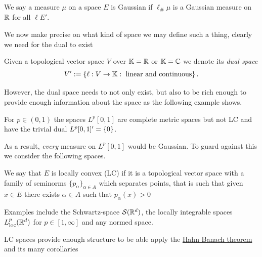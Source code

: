 \documentclass[
    a4paper,
    DIV=14,
    abstract=true,
    numbers=noenddot
]{scrartcl}
\begin{document}
\begin{definition}[Heuristic]
    We say a measure $\mu$ on a space $E$ is Gaussian if $\ell_{\#} \mu$ is a Gaussian measure on $\mathbb{R}$ for all $\ell E'$.
\end{definition}
We now make precise on what kind of space we may define such a thing, clearly we need for the dual to exist
\begin{definition}
Given a topological vector space $V$ over {$\mathbb{K}=\mathbb{R}$ or $\mathbb{K}=\mathbb{C}$}   we denote its \emph{dual space}
\begin{align*}
    V':=\left\{\ell :V\to {\mathbb{K}}: \text{ linear and continuous}\right\}.
\end{align*}
  \end{definition}
However, the dual space needs to not only exist, but also to be rich enough to provide enough information about the space as the following example shows.
\begin{example}
     For $p \in (0,1)$ the spaces $L^p[0,1]$ are complete metric spaces but not LC and have the trivial dual $L^p[0,1]'= \left\{0\right\} $.\exampleSymbol
\end{example}
As a result, \emph{every} measure on $L^p[0,1]$ would be Gaussian. To guard against this we consider the following spaces.
\begin{definition}
    We say that $E$ is locally convex (LC) if it is a topological vector space with a family of seminorms $\{p_\alpha\}_{\alpha \in A }$ which separates points, that is such that given $x \in E$ there exists $\alpha \in A$ such that $p_\alpha(x)>0$
\end{definition}
Examples include the Schwartz-space $\mathcal{S}(\mathbb{R}^d)$, the locally integrable spaces $L^p_{\mathrm{loc}}(\mathbb{R}^d)$ for $p \in [1, \infty]$ and any normed space.  

LC spaces provide enough structure to be able apply the \href{https://en.wikipedia.org/wiki/Hahn%E2%80%93Banach_theorem#Hahn%E2%80%93Banach_theorem:~:text=The-,Hahn%E2%80%93Banach%20theorem,-can%20be%20used}{Hahn Banach theorem} and its many corollaries 
\end{document}
